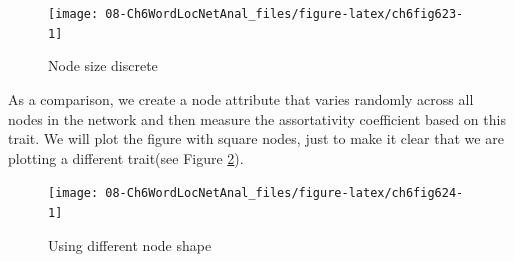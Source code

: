 \documentclass[
]{article}
\newenvironment{Shaded}{\begin{snugshade}}{\end{snugshade}}
\newcommand{\AttributeTok}[1]{\textcolor[rgb]{0.13,0.29,0.53}{#1}}
\newcommand{\CommentTok}[1]{\textcolor[rgb]{0.56,0.35,0.01}{\textit{#1}}}
\newcommand{\DecValTok}[1]{\textcolor[rgb]{0.00,0.00,0.81}{#1}}
\newcommand{\FunctionTok}[1]{\textcolor[rgb]{0.13,0.29,0.53}{\textbf{#1}}}
\newcommand{\NormalTok}[1]{#1}
\newcommand{\OtherTok}[1]{\textcolor[rgb]{0.56,0.35,0.01}{#1}}
\newcommand{\SpecialCharTok}[1]{\textcolor[rgb]{0.81,0.36,0.00}{\textbf{#1}}}
\newcommand{\StringTok}[1]{\textcolor[rgb]{0.31,0.60,0.02}{#1}}
\begin{document}
\begin{figure}

{\centering \texttt{[image: 08-Ch6WordLocNetAnal\_files/figure-latex/ch6fig623-1]} 

}

\caption{Node size discrete}\label{fig:ch6fig623}
\end{figure}

\begin{Shaded}
\end{Shaded}

As a comparison, we create a node attribute that varies randomly across all nodes in the network and then measure the assortativity coefficient based on this trait. We will plot the figure with square nodes, just to make it clear that we are plotting a different trait(see Figure \ref{fig:ch6fig624}).

\begin{Shaded}
\end{Shaded}

\begin{figure}

{\centering \texttt{[image: 08-Ch6WordLocNetAnal\_files/figure-latex/ch6fig624-1]} 

}

\caption{Using different node shape}\label{fig:ch6fig624}
\end{figure}
\end{document}

